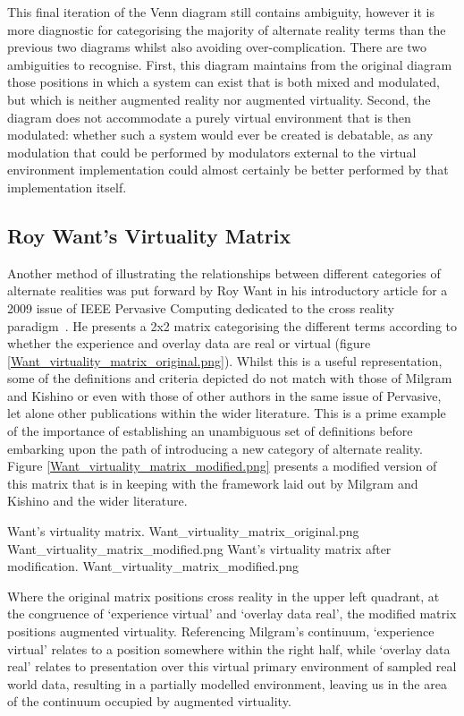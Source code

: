 This final iteration of the Venn diagram still contains ambiguity, however it is more diagnostic for categorising the majority of alternate reality terms than the previous two diagrams whilst also avoiding over-complication. There are two ambiguities to recognise. First, this diagram maintains from the original diagram those positions in which a system can exist that is both mixed and modulated, but which is neither augmented reality nor augmented virtuality. Second, the diagram does not accommodate a purely virtual environment that is then modulated: whether such a system would ever be created is debatable, as any modulation that could be performed by modulators external to the virtual environment implementation could almost certainly be better performed by that implementation itself.

\subsection{Roy Want's Virtuality Matrix}
\label{roy-wants-virtuality-matrix}
Another method of illustrating the relationships between different categories of alternate realities was put forward by Roy Want in his introductory article for a 2009 issue of IEEE Pervasive Computing dedicated to the cross reality paradigm~\cite{Want2009}. He presents a 2x2 matrix categorising the different terms according to whether the experience and overlay data are real or virtual (figure \ref{Want_virtuality_matrix_original.png}). Whilst this is a useful representation, some of the definitions and criteria depicted do not match with those of Milgram and Kishino or even with those of other authors in the same issue of Pervasive, let alone other publications within the wider literature. This is a prime example of the importance of establishing an unambiguous set of definitions before embarking upon the path of introducing a new category of alternate reality. Figure \ref{Want_virtuality_matrix_modified.png} presents a modified version of this matrix that is in keeping with the framework laid out by Milgram and Kishino and the wider literature.

 {Want's virtuality matrix.} {Want_virtuality_matrix_original.png}
       {Want_virtuality_matrix_modified.png} {Want's virtuality matrix after modification.} {Want_virtuality_matrix_modified.png}

Where the original matrix positions cross reality in the upper left quadrant, at the congruence of `experience virtual' and `overlay data real', the modified matrix positions augmented virtuality. Referencing Milgram's continuum, `experience virtual' relates to a position somewhere within the right half, while `overlay data real' relates to presentation over this virtual primary environment of sampled real world data, resulting in a partially modelled environment, leaving us in the area of the continuum occupied by augmented virtuality.

